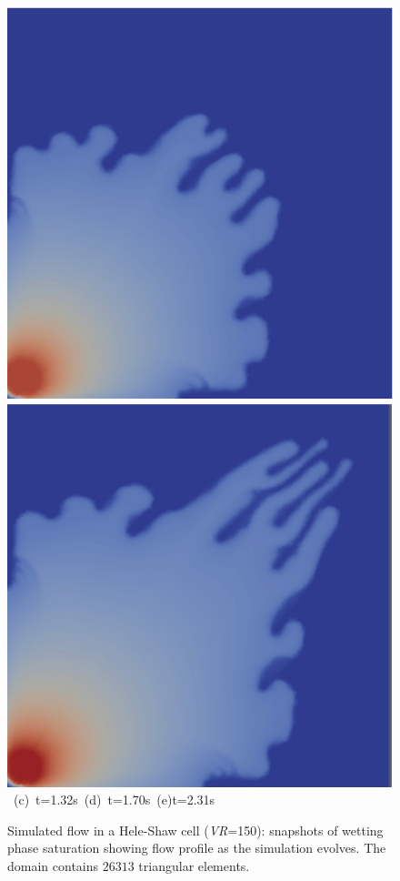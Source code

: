 \begin{landscape}
\begin{figure}[ht]
{{      \includegraphics[width=.5\textwidth]{./Pics1/Saffman_homogeneous_VR150/ST_Homog_VR150_D4000b}
      \includegraphics[width=.5\textwidth]{./Pics1/Saffman_homogeneous_VR150/ST_Homog_VR150_D7000b}}
\vspace{0.cm}
\hbox{ \hspace{2.cm} (c) t=1.32s \hspace{4.5cm} (d) t=1.70s \hspace{4.5cm} (e)t=2.31s}
\vspace{0.cm}
}   
\caption{Simulated flow in a Hele-Shaw cell ({\it VR}=150): snapshots of wetting phase saturation showing flow profile as the simulation evolves. The domain contains $26313$  triangular elements.}
\label{fig:homoheleshaw_VN10}
\end{figure}
\end{landscape}
\clearpage


